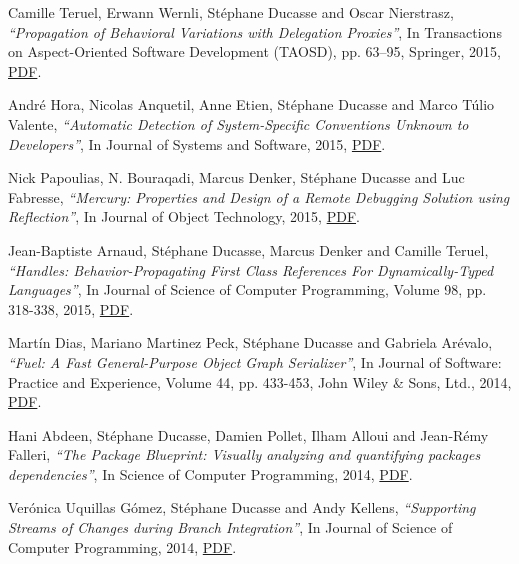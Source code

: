 \documentclass{article}
\newcommand{\czauthors}[1]{#1}
\newcommand{\cztitle}[1]{\emph{``#1''}}
\newcommand{\czjournal}[1]{#1}
\begin{document}
\begin{itemize}
	\pub  \czauthors{Camille Teruel, Erwann Wernli, St\'ephane Ducasse and Oscar Nierstrasz},  \cztitle{Propagation of Behavioral Variations with Delegation Proxies},  In \czjournal{Transactions on Aspect-Oriented Software Development (TAOSD)}, pp. 63--95, Springer, 2015, \href{http://rmod-files.lille.inria.fr/Team/Texts/Papers/Teru15a-Propagation-of-Behavioral-Variations-with-Delegation-Proxies.pdf}{PDF}.

	\pub  \czauthors{Andr\'e Hora, Nicolas Anquetil, Anne Etien, St\'ephane Ducasse and Marco T\'ulio Valente},  \cztitle{Automatic Detection of System-Specific Conventions Unknown to Developers},  In \czjournal{Journal of Systems and Software}, 2015, \href{http://rmod-files.lille.inria.fr/Team/Texts/Papers/Hora15b-JSS-detection-specific-conventions.pdf}{PDF}.

	\pub  \czauthors{Nick Papoulias, N. Bouraqadi, Marcus Denker, St\'ephane Ducasse and Luc Fabresse},  \cztitle{Mercury: Properties and Design of a Remote Debugging Solution using Reflection},  In \czjournal{Journal of Object Technology}, 2015, \href{http://rmod-files.lille.inria.fr/Team/Texts/Papers/Papo15b-Mercury-JOT.pdf}{PDF}.

	\pub  \czauthors{Jean-Baptiste Arnaud, St\'ephane Ducasse, Marcus Denker and Camille Teruel},  \cztitle{Handles: Behavior-Propagating First Class References For Dynamically-Typed Languages},  In \czjournal{Journal of Science of Computer Programming}, Volume 98, pp. 318-338, 2015, \href{http://rmod-files.lille.inria.fr/Team/Texts/Papers/Arna14a-SCICO-Handles.pdf}{PDF}.

	\pub  \czauthors{Mart\'in Dias, Mariano Martinez Peck, St\'ephane Ducasse and Gabriela Ar\'evalo},  \cztitle{Fuel: A Fast General-Purpose Object Graph Serializer},  In \czjournal{Journal of Software: Practice and Experience}, Volume 44, pp. 433-453, John Wiley \& Sons, Ltd., 2014, \href{http://rmod-files.lille.inria.fr/Team/Texts/Papers/Dias14a-Official-SPE-Fuel.pdf}{PDF}.

	\pub  \czauthors{Hani Abdeen, St\'ephane Ducasse, Damien Pollet, Ilham Alloui and Jean-R\'emy Falleri},  \cztitle{The Package Blueprint: Visually analyzing and quantifying packages dependencies},  In \czjournal{Science of Computer Programming}, 2014, \href{http://rmod-files.lille.inria.fr/Team/Texts/Papers/Abde14a-Official-PackageBlueprint-SCP.pdf}{PDF}.

	\pub  \czauthors{Ver\'onica Uquillas G\'omez, St\'ephane Ducasse and Andy Kellens},  \cztitle{Supporting Streams of Changes during Branch Integration},  In \czjournal{Journal of Science of Computer Programming}, 2014, \href{http://rmod-files.lille.inria.fr/Team/Texts/Papers/Uqui14a-SCISCO-StreamsOfChanges.pdf}{PDF}.


\end{itemize}
\end{document}
